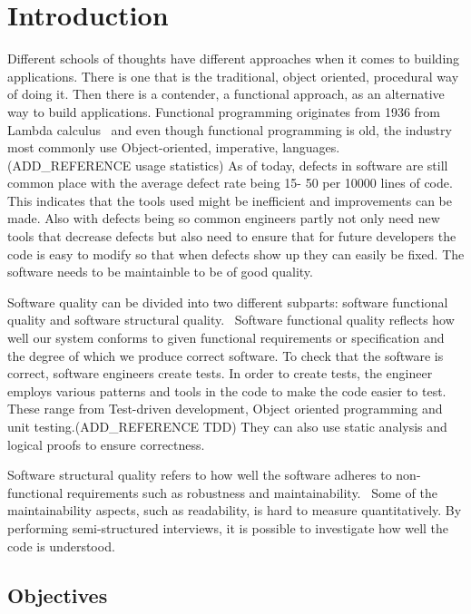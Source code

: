 \chapter{Introduction}\label{introduction}

Different schools of thoughts have different approaches when it comes to
building applications. There is one that is the traditional, object oriented,
procedural way of doing it. Then there is a contender, a functional approach, as
an alternative way to build applications. Functional programming originates from
1936 from Lambda calculus~\cite{Turner} and even though functional programming
is old, the industry most commonly use Object-oriented, imperative, languages.
(ADD\_REFERENCE usage statistics) As of today, defects in software are still
common place with the average defect rate being 15- 50 per 10000 lines of
code.~\cite{McConnell:2004:CCS:1096143} This indicates that the tools used might
be inefficient and improvements can be made. Also with defects being so common
engineers partly not only need new tools that decrease defects but also need to
ensure that for future developers the code is easy to modify so that when
defects show up they can easily be fixed. The software needs to be maintainble
to be of good quality.

Software quality can be divided into two different subparts: software functional
quality and software structural quality.~\cite{Pressman:2004:SEP:994110}
Software functional quality reflects how well our system conforms to given
functional requirements or specification and the degree of which we produce
correct software.  To check that the software is correct, software engineers
create tests. In order to create tests, the engineer employs various patterns
and tools in the code to make the code easier to test. These range from
Test-driven development, Object oriented programming and unit
testing.(ADD\_REFERENCE TDD) They can also use static analysis and logical
proofs to ensure correctness. 

Software structural quality refers to how well the software adheres to
non-functional requirements such as robustness and
maintainability.~\cite{Pressman:2004:SEP:994110} Some of the maintainability
aspects, such as readability, is hard to measure quantitatively. By performing
semi-structured interviews, it is possible to investigate how well the code is
understood. 

\section{Objectives}

